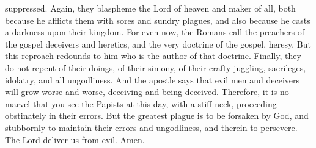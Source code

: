 suppressed. Again, they blaspheme the Lord of heaven and maker of all, both because he afflicts them with sores and sundry plagues, and also because he casts a darkness upon their kingdom. For even now, the Romans call the preachers of the gospel deceivers and heretics, and the very doctrine of the gospel, heresy. But this reproach redounds to him who is the author of that doctrine. Finally, they do not repent of their doings, of their simony, of their crafty juggling, sacrileges, idolatry, and all ungodliness. And the apostle says that evil men and deceivers will grow worse and worse, deceiving and being deceived. Therefore, it is no marvel that you see the Papists at this day, with a stiff neck, proceeding obstinately in their errors. But the greatest plague is to be forsaken by God, and stubbornly to maintain their errors and ungodliness, and therein to persevere. The Lord deliver us from evil. Amen.
